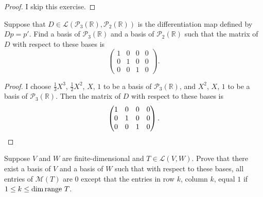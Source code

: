 \begin{proof}
    I skip this exercise.
\end{proof}
\newpage

\begin{exercise}
    Suppose that $D \in \mathcal{L}(\mathcal{P}_{3} (\mathbb{R}), \mathcal{P}_{2} (\mathbb{R}))$ is the differentiation map defined by $Dp = p'$. Find a basis of $\mathcal{P}_{3} (\mathbb{R})$ and a basis of $\mathcal{P}_{2} (\mathbb{R})$ such that the matrix of $D$ with respect to these bases is
    \[
        \begin{pmatrix}
            1 & 0 & 0 & 0 \\
            0 & 1 & 0 & 0 \\
            0 & 0 & 1 & 0
        \end{pmatrix}.
    \]
\end{exercise}

\begin{proof}
    I choose $\frac{1}{3}X^{3}$, $\frac{1}{2}X^{2}$, $X$, $1$ to be a basis of $\mathcal{P}_{3}(\mathbb{R})$, and $X^{2}$, $X$, $1$ to be a basis of $\mathcal{P}_{3}(\mathbb{R})$. Then the matrix of $D$ with respect to these bases is
    \[
        \begin{pmatrix}
            1 & 0 & 0 & 0 \\
            0 & 1 & 0 & 0 \\
            0 & 0 & 1 & 0
        \end{pmatrix}.\qedhere
    \]
\end{proof}
\newpage

\begin{exercise}
    Suppose $V$ and $W$ are finite-dimensional and $T \in \mathcal{L}(V, W)$. Prove that there exist a basis of $V$ and a basis of $W$ such that with respect to these bases, all entries of $\mathcal{M}(T)$ are $0$ except that the entries in row $k$, column $k$, equal $1$ if $1\leq k \leq \dim\operatorname{range}\,{T}$.
\end{exercise}

